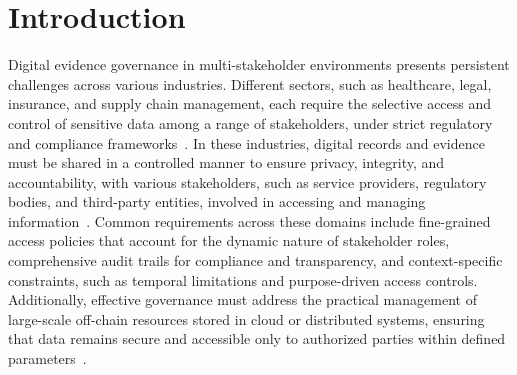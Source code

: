 \documentclass[pdflatex,sn-mathphys-num]{sn-jnl}
\begin{document}

\maketitle

\section{Introduction}
Digital evidence governance in multi-stakeholder environments presents persistent challenges across various industries. Different sectors, such as healthcare, legal, insurance, and supply chain management, each require the selective access and control of sensitive data among a range of stakeholders, under strict regulatory and compliance frameworks~\cite{su172310855}. In these industries, digital records and evidence must be shared in a controlled manner to ensure privacy, integrity, and accountability, with various stakeholders, such as service providers, regulatory bodies, and third-party entities, involved in accessing and managing information~\cite{liang2017mhealth}. Common requirements across these domains include fine-grained access policies that account for the dynamic nature of stakeholder roles, comprehensive audit trails for compliance and transparency, and context-specific constraints, such as temporal limitations and purpose-driven access controls. Additionally, effective governance must address the practical management of large-scale off-chain resources stored in cloud or distributed systems, ensuring that data remains secure and accessible only to authorized parties within defined parameters~\cite{EsSamaali2017BlockchainAccessControl, theodouli2018healthcare}.
\end{document}
